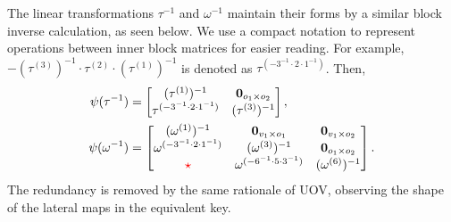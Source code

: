 \documentclass[12pt, a4paper, oneside]{memoir}
\theoremstyle{definition}
\begin{document}
The linear transformations $\tau^{-1}$ and $\omega^{-1}$ maintain their forms by a similar block inverse calculation, as seen below. We use a compact notation to represent operations between inner block matrices for easier reading. For example, $-(\tau^{(3)})^{-1} \cdot \tau^{(2)} \cdot (\tau^{(1)})^{-1}$ is denoted as $\tau^{(-3^{-1} \cdot 2 \cdot 1^{-1})}$. Then,
\begin{align}
  \begin{split}
    \psi(\tau^{-1}) &=
    \begin{bmatrix}
      (\tau^{(1)})^{-1} & \mathbf{0}_{o_{1} \times o_{2}} \\
      \tau^{(-3^{-1} \cdot 2 \cdot 1^{-1})} & (\tau^{(3)})^{-1} \\
    \end{bmatrix}, \\
    \psi(\omega^{-1}) &=
    \begin{bmatrix}
      (\omega^{(1)})^{-1} & \mathbf{0}_{v_{1} \times o_{1}} & \mathbf{0}_{v_{1} \times o_{2}} \\
      \omega^{(-3^{-1} \cdot 2 \cdot 1^{-1})} & (\omega^{(3)})^{-1} & \mathbf{0}_{o_{1} \times o_{2}} \\
      {\color{red} \star} & \omega^{(-6^{-1} \cdot 5 \cdot 3^{-1})} & (\omega^{(6)})^{-1} \\
    \end{bmatrix}.
  \end{split}
\end{align}
The redundancy is removed by the same rationale of UOV, observing the shape of the lateral maps in the equivalent key.
\end{document}
